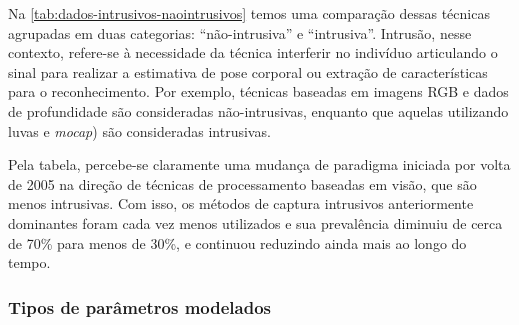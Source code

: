 
Na \autoref{tab:dados-intrusivos-naointrusivos} temos uma comparação dessas técnicas agrupadas em duas categorias: ``não-intrusiva'' e ``intrusiva''. Intrusão, nesse contexto, refere-se à necessidade da técnica interferir no indivíduo articulando o sinal para realizar a estimativa de pose corporal ou extração de características para o reconhecimento. Por exemplo, técnicas baseadas em imagens RGB e dados de profundidade são consideradas não-intrusivas, enquanto que aquelas utilizando luvas e \textit{mocap}) são consideradas intrusivas. 

Pela tabela, percebe-se claramente uma mudança de paradigma iniciada por volta de 2005 na direção de técnicas de processamento baseadas em visão, que são menos intrusivas. Com isso, os métodos de captura intrusivos anteriormente dominantes foram cada vez menos utilizados e sua prevalência diminuiu de cerca de 70\% para menos de 30\%, e continuou reduzindo ainda mais ao longo do tempo.





\subsubsection{Tipos de parâmetros modelados}
\label{slr-parametros-modelados}

